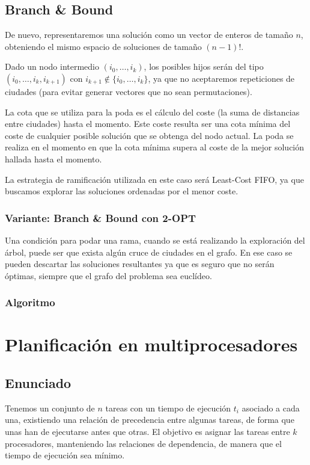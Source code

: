 \documentclass[a4paper, 11pt]{article} %
\begin{document}
	
        \small
  	\texttt{}
        \normalsize

  \subsection{Branch \& Bound}
  De nuevo, representaremos una solución como un vector de enteros de tamaño $n$, obteniendo el mismo espacio de soluciones de tamaño $(n-1)!$.
  
  Dado un nodo intermedio $(i_0, \dots, i_k)$, los posibles hijos serán del tipo\\ $(i_0, \dots, i_k, i_{k+1})$ con $i_{k+1} \notin \{i_0, \dots, i_k\}$, ya que no aceptaremos repeticiones de ciudades (para evitar generar vectores que no sean permutaciones).
  
  La cota que se utiliza para la poda es el cálculo del coste (la suma de distancias entre ciudades) hasta el momento. Este coste resulta ser una cota mínima del coste de cualquier posible solución que se obtenga del nodo actual.
  La poda se realiza en el momento en que la cota mínima supera al coste de la mejor solución hallada hasta el momento.
  
  La estrategia de ramificación utilizada en este caso será Least-Cost FIFO, ya que buscamos explorar las soluciones ordenadas por el menor coste.

\subsubsection{Variante: Branch \& Bound con 2-OPT}
  Una condición para podar una rama, cuando se está realizando la exploración del árbol, puede ser que exista algún cruce de ciudades en el grafo. En ese caso se pueden descartar las soluciones resultantes ya que es seguro que no serán óptimas, siempre que el grafo del problema sea euclídeo.

  \subsubsection{Algoritmo}
  
    \small
  	\texttt{}
     \normalsize

\section{Planificación en multiprocesadores}
  \subsection{Enunciado}
  Tenemos un conjunto de $n$ tareas con un tiempo de ejecución $t_i$ asociado a cada una, existiendo una relación de precedencia
  entre algunas tareas, de forma que unas han de ejecutarse antes que otras. El objetivo es asignar las tareas entre $k$ procesadores, manteniendo las relaciones de dependencia, de manera que el tiempo de ejecución sea mínimo. 
  
\end{document}
